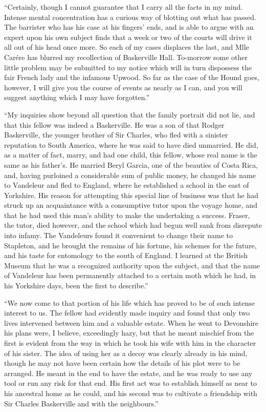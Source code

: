 \documentclass[paper=5.5in:8.5in,BCOR=7mm,twoside,DIV=calc,12pt,usegeometry,openany,chapterprefix,endperiod,headings=big]{scrbook} %
\begin{document}
\enquote{Certainly, though I cannot guarantee that I carry all the facts in my mind. Intense mental concentration has a curious way of blotting out what has passed. The barrister who has his case at his fingers' ends, and is able to argue with an expert upon his own subject finds that a week or two of the courts will drive it all out of his head once more. So each of my cases displaces the last, and Mlle Carére has blurred my recollection of Baskerville Hall. To-morrow some other little problem may be submitted to my notice which will in turn dispossess the fair French lady and the infamous Upwood. So far as the case of the Hound goes, however, I will give you the course of events as nearly as I can, and you will suggest anything which I may have forgotten.}

\enquote{My inquiries show beyond all question that the family portrait did not lie, and that this fellow was indeed a Baskerville. He was a son of that Rodger Baskerville, the younger brother of Sir Charles, who fled with a sinister reputation to South America, where he was said to have died unmarried. He did, as a matter of fact, marry, and had one child, this fellow, whose real name is the same as his father's. He married Beryl Garcia, one of the beauties of Costa Rica, and, having purloined a considerable sum of public money, he changed his name to Vandeleur and fled to England, where he established a school in the east of Yorkshire. His reason for attempting this special line of business was that he had struck up an acquaintance with a consumptive tutor upon the voyage home, and that he had used this man's ability to make the undertaking a success. Fraser, the tutor, died however, and the school which had begun well sank from disrepute into infamy. The Vandeleurs found it convenient to change their name to Stapleton, and he brought the remains of his fortune, his schemes for the future, and his taste for entomology to the south of England. I learned at the British Museum that he was a recognized authority upon the subject, and that the name of Vandeleur has been permanently attached to a certain moth which he had, in his Yorkshire days, been the first to describe.}

\enquote{We now come to that portion of his life which has proved to be of such intense interest to us. The fellow had evidently made inquiry and found that only two lives intervened between him and a valuable estate. When he went to Devonshire his plans were, I believe, exceedingly hazy, but that he meant mischief from the first is evident from the way in which he took his wife with him in the character of his sister. The idea of using her as a decoy was clearly already in his mind, though he may not have been certain how the details of his plot were to be arranged. He meant in the end to have the estate, and he was ready to use any tool or run any risk for that end. His first act was to establish himself as near to his ancestral home as he could, and his second was to cultivate a friendship with Sir Charles Baskerville and with the neighbours.}
\end{document}
